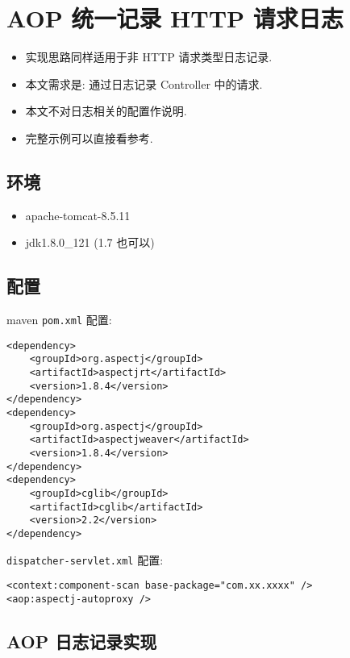 \section{AOP 统一记录 HTTP
请求日志}\label{aop-ux7edfux4e00ux8bb0ux5f55-http-ux8bf7ux6c42ux65e5ux5fd7}

\begin{itemize}
\tightlist
\item
  实现思路同样适用于非 HTTP 请求类型日志记录.
\item
  本文需求是: 通过日志记录 Controller 中的请求.
\item
  本文不对日志相关的配置作说明.
\item
  完整示例可以直接看参考.
\end{itemize}

\subsection{环境}\label{ux73afux5883}

\begin{itemize}
\tightlist
\item
  apache-tomcat-8.5.11
\item
  jdk1.8.0\_121 (1.7 也可以)
\end{itemize}

\subsection{配置}\label{ux914dux7f6e}

maven \lstinline!pom.xml! 配置:

\begin{lstlisting}
<dependency>
    <groupId>org.aspectj</groupId>
    <artifactId>aspectjrt</artifactId>
    <version>1.8.4</version>
</dependency>
<dependency>
    <groupId>org.aspectj</groupId>
    <artifactId>aspectjweaver</artifactId>
    <version>1.8.4</version>
</dependency>
<dependency>
    <groupId>cglib</groupId>
    <artifactId>cglib</artifactId>
    <version>2.2</version>
</dependency>
\end{lstlisting}

\lstinline!dispatcher-servlet.xml! 配置:

\begin{lstlisting}
<context:component-scan base-package="com.xx.xxxx" />
<aop:aspectj-autoproxy />
\end{lstlisting}

\subsection{AOP
日志记录实现}\label{aop-ux65e5ux5fd7ux8bb0ux5f55ux5b9eux73b0}

